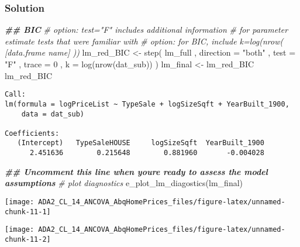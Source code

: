 \documentclass[
  12pt,
]{article}
\newenvironment{Shaded}{\begin{snugshade}}{\end{snugshade}}
\newcommand{\AttributeTok}[1]{\textcolor[rgb]{0.77,0.63,0.00}{#1}}
\newcommand{\CommentTok}[1]{\textcolor[rgb]{0.56,0.35,0.01}{\textit{#1}}}
\newcommand{\DecValTok}[1]{\textcolor[rgb]{0.00,0.00,0.81}{#1}}
\newcommand{\DocumentationTok}[1]{\textcolor[rgb]{0.56,0.35,0.01}{\textbf{\textit{#1}}}}
\newcommand{\FunctionTok}[1]{\textcolor[rgb]{0.00,0.00,0.00}{#1}}
\newcommand{\NormalTok}[1]{#1}
\newcommand{\OtherTok}[1]{\textcolor[rgb]{0.56,0.35,0.01}{#1}}
\newcommand{\StringTok}[1]{\textcolor[rgb]{0.31,0.60,0.02}{#1}}
\begin{document}
\hypertarget{solution-3}{%
\subsubsection{Solution}\label{solution-3}}

\begin{Shaded}
\begin{Highlighting}[]
\DocumentationTok{\#\# BIC}
\CommentTok{\# option: test="F" includes additional information}
\CommentTok{\#           for parameter estimate tests that we\textquotesingle{}re familiar with}
\CommentTok{\# option: for BIC, include k=log(nrow( [data.frame name] ))}
\NormalTok{lm\_red\_BIC }\OtherTok{\textless{}{-}}
  \FunctionTok{step}\NormalTok{(}
\NormalTok{    lm\_full}
\NormalTok{  , }\AttributeTok{direction =} \StringTok{"both"}
\NormalTok{  , }\AttributeTok{test =} \StringTok{"F"}
\NormalTok{  , }\AttributeTok{trace =} \DecValTok{0}
\NormalTok{  , }\AttributeTok{k =} \FunctionTok{log}\NormalTok{(}\FunctionTok{nrow}\NormalTok{(dat\_sub))}
\NormalTok{  )}
\NormalTok{lm\_final }\OtherTok{\textless{}{-}}\NormalTok{ lm\_red\_BIC}
\NormalTok{lm\_red\_BIC}
\end{Highlighting}
\end{Shaded}

\begin{verbatim}
Call:
lm(formula = logPriceList ~ TypeSale + logSizeSqft + YearBuilt_1900, 
    data = dat_sub)

Coefficients:
   (Intercept)   TypeSaleHOUSE     logSizeSqft  YearBuilt_1900  
      2.451636        0.215648        0.881960       -0.004028  
\end{verbatim}

\begin{Shaded}
\begin{Highlighting}[]
\DocumentationTok{\#\# Uncomment this line when you\textquotesingle{}re ready to assess the model assumptions}
\CommentTok{\# plot diagnostics}
\FunctionTok{e\_plot\_lm\_diagostics}\NormalTok{(lm\_final)}
\end{Highlighting}
\end{Shaded}

\begin{center}\texttt{[image: ADA2\_CL\_14\_ANCOVA\_AbqHomePrices\_files/figure-latex/unnamed-chunk-11-1]} \end{center}

\begin{center}\texttt{[image: ADA2\_CL\_14\_ANCOVA\_AbqHomePrices\_files/figure-latex/unnamed-chunk-11-2]} \end{center}
\end{document}
